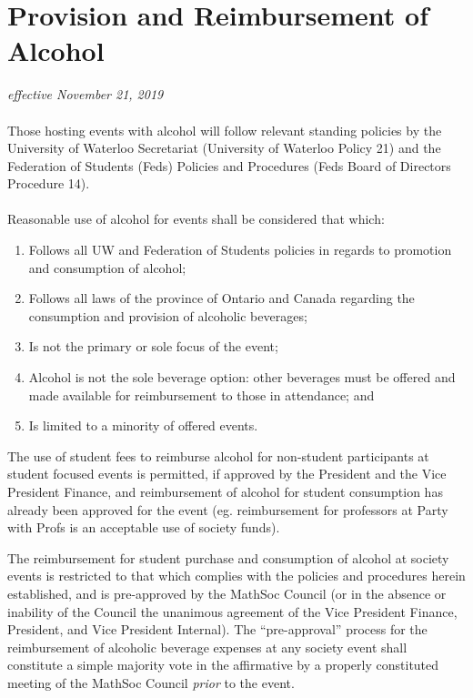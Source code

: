 \section{Provision and Reimbursement of Alcohol}
\emph{effective November 21, 2019}\\
\paragraph{}

Those hosting events with alcohol will follow relevant standing policies by the University of Waterloo Secretariat (University of Waterloo Policy 21) and the Federation of Students (Feds) Policies and Procedures (Feds Board of Directors Procedure 14).
\paragraph{}
Reasonable use of alcohol for events shall be considered that which:
\begin{enumerate}
\item Follows all UW and Federation of Students policies in regards to promotion and consumption of alcohol;
\item Follows all laws of the province of Ontario and Canada regarding the consumption and provision of alcoholic beverages;
\item Is not the primary or sole focus of the event;
\item Alcohol is not the sole beverage option: other beverages must be offered and made available for reimbursement to those in attendance; and
\item Is limited to a minority of offered events.
\end{enumerate}

The use of student fees to reimburse alcohol for non-student participants at student focused events is permitted, if approved by the President and the Vice President Finance, and reimbursement of alcohol for student consumption has already been approved for the event (eg. reimbursement for professors at Party with Profs is an acceptable use of society funds).

The reimbursement for student purchase and consumption of alcohol at society events is restricted to that which complies with the policies and procedures herein established, and is pre-approved by the MathSoc Council (or in the absence or inability of the Council the unanimous agreement of the Vice President Finance, President, and Vice President Internal). The “pre-approval” process for the reimbursement of alcoholic beverage expenses at any society event shall constitute a simple majority vote in the affirmative by a properly constituted meeting of the MathSoc Council \textit{prior} to the event.

